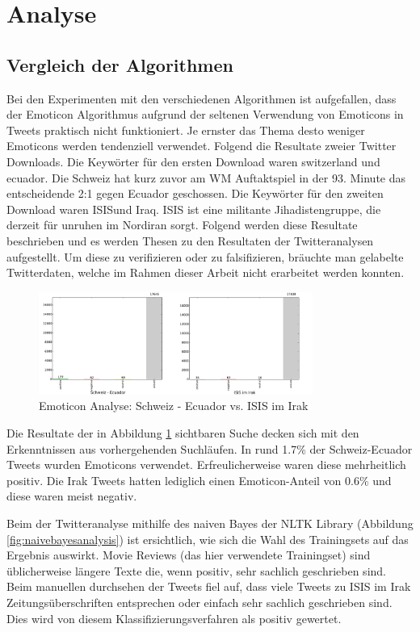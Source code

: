 \clearpage
\section{Analyse}
\subsection{Vergleich der Algorithmen}
Bei den Experimenten mit den verschiedenen Algorithmen ist aufgefallen, dass der Emoticon Algorithmus aufgrund der seltenen Verwendung von Emoticons in Tweets praktisch nicht funktioniert. Je ernster das Thema desto weniger Emoticons werden tendenziell verwendet. Folgend die Resultate zweier Twitter Downloads. Die Keywörter für den ersten Download waren \flqq switzerland \frqq und \flqq ecuador\frqq. Die Schweiz hat kurz zuvor am WM Auftaktspiel in der 93. Minute das entscheidende 2:1 gegen Ecuador geschossen. Die Keywörter für den zweiten Download waren \flqq ISIS\frqq und \flqq Iraq\flqq. ISIS ist eine militante Jihadistengruppe, die derzeit für unruhen im Nordiran sorgt. \cite{isis} Folgend werden diese Resultate beschrieben und es werden Thesen zu den Resultaten der Twitteranalysen aufgestellt. Um diese zu verifizieren oder zu falsifizieren, bräuchte man gelabelte Twitterdaten, welche im Rahmen dieser Arbeit nicht erarbeitet werden konnten.

\begin{figure}[h]
  \centering
  \includegraphics[width=0.8\textwidth]{images/schweizvsirak_emoticon.pdf}
  \caption[Emoticon Analyse: Schweiz - Ecuador vs. ISIS im Irak]{Emoticon Analyse: Schweiz - Ecuador vs. ISIS im Irak}
  \label{fig:emoticonanalysis}
\end{figure}

Die Resultate der in Abbildung \ref{fig:emoticonanalysis} sichtbaren Suche decken sich mit den Erkenntnissen aus vorhergehenden Suchläufen. In rund 1.7\% der Schweiz-Ecuador Tweets wurden Emoticons verwendet. Erfreulicherweise waren diese mehrheitlich positiv. Die Irak Tweets hatten lediglich einen Emoticon-Anteil von 0.6\% und diese waren meist negativ.

Beim der Twitteranalyse mithilfe des naiven Bayes der NLTK Library (Abbildung \ref{fig:naivebayesanalysis}) ist ersichtlich, wie sich die Wahl des Trainingsets auf das Ergebnis auswirkt. Movie Reviews (das hier verwendete Trainingset) sind üblicherweise längere Texte die, wenn positiv, sehr sachlich geschrieben sind. Beim manuellen durchsehen der Tweets fiel auf, dass viele Tweets zu ISIS im Irak Zeitungsüberschriften entsprechen oder einfach sehr sachlich geschrieben sind. Dies wird von diesem Klassifizierungsverfahren als positiv gewertet.

